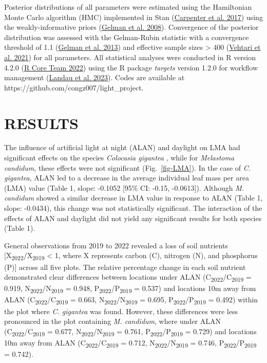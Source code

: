 \documentclass[
  12pt,
  letterpaper,
  DIV=11,
  numbers=noendperiod]{scrartcl}
\begin{document}
Posterior distributions of all parameters were estimated using the
Hamiltonian Monte Carlo algorithm (HMC) implemented in Stan
(\protect\hyperlink{ref-Carpenter2017}{Carpenter et al. 2017}) using the
weakly-informative priors (\protect\hyperlink{ref-Gelman2008}{Gelman et
al. 2008}). Convergence of the posterior distribution was assessed with
the Gelman-Rubin statistic with a convergence threshold of 1.1
(\protect\hyperlink{ref-Gelman2013}{Gelman et al. 2013}) and effective
sample sizes \textgreater{} 400
(\protect\hyperlink{ref-Vehtari2021}{Vehtari et al. 2021}) for all
parameters. All statistical analyses were conducted in R version 4.2.0
(\protect\hyperlink{ref-RCoreTeam2022}{R Core Team 2022}) using the R
package \emph{targets} version 1.2.0 for workflow management
(\protect\hyperlink{ref-Landau2023}{Landau et al. 2023}). Codes are
available at https://github.com/congz007/light\_project.

\hypertarget{results}{%
\section{RESULTS}\label{results}}

The influence of artificial light at night (ALAN) and daylight on LMA
had significant effects on the species \emph{Colocasia gigantea }, while
for \emph{Melastoma candidum}, these effects were not significant
(Fig.~\ref{fig-LMA}). In the case of \emph{C. gigantea}, ALAN led to a
decrease in the average individual leaf mass per area (LMA) value (Table
1, slope: -0.1052 {[}95\% CI: -0.15, -0.0613{]}). Although \emph{M.
candidum} showed a similar decrease in LMA value in response to ALAN
(Table 1, slope: -0.0434), this change was not statistically
significant. The interaction of the effects of ALAN and daylight did not
yield any significant results for both species (Table 1).

General observations from 2019 to 2022 revealed a loss of soil nutrients
{[}X\textsubscript{2022}/X\textsubscript{2019} \textless{} 1, where X
represents carbon (C), nitrogen (N), and phosphorus (P){]} across all
five plots. The relative percentage change in each soil nutrient
demonstrated clear differences between locations under ALAN
(C\textsubscript{2022}/C\textsubscript{2019} = 0.919,
N\textsubscript{2022}/N\textsubscript{2019} = 0.948,
P\textsubscript{2022}/P\textsubscript{2019} = 0.537) and locations 10m
away from ALAN (C\textsubscript{2022}/C\textsubscript{2019} = 0.663,
N\textsubscript{2022}/N\textsubscript{2019} = 0.695,
P\textsubscript{2022}/P\textsubscript{2019} = 0.492) within the plot
where \emph{C. gigantea} was found. However, these differences were less
pronounced in the plot containing \emph{M. candidum}, where under ALAN
(C\textsubscript{2022}/C\textsubscript{2019} = 0.677,
N\textsubscript{2022}/N\textsubscript{2019} = 0.761,
P\textsubscript{2022}/P\textsubscript{2019} = 0.729) and locations 10m
away from ALAN (C\textsubscript{2022}/C\textsubscript{2019} = 0.712,
N\textsubscript{2022}/N\textsubscript{2019} = 0.746,
P\textsubscript{2022}/P\textsubscript{2019} = 0.742).
\end{document}
